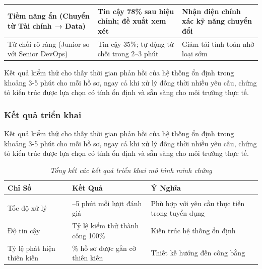 \documentclass{article}
\begin{document}
\begin{itemize}[topsep=0pt, itemsep=4pt, leftmargin=40pt]
\begin{longtable}{|
  >{\raggedright\arraybackslash}p{}|
  >{\raggedright\arraybackslash}p{}|
  >{\raggedright\arraybackslash}p{}|}
  Tiềm năng ẩn (Chuyển từ Tài chính → Data) &
  Tin cậy 78\% sau hiệu chỉnh; đề xuất xem xét &
  Nhận diện chính xác kỹ năng chuyển đổi \\
  \hline

  Từ chối rõ ràng (Junior so với Senior DevOps) &
  Tin cậy 35\%; tự động từ chối trong 2–3 phút &
  Giảm tải tính toán nhờ loại sớm \\

\end{longtable}

Kết quả kiểm thử cho thấy thời gian phản hồi của hệ thống ổn định trong khoảng 3-5 phút cho mỗi hồ sơ, ngay cả khi xử lý đồng thời nhiều yêu cầu, chứng tỏ kiến trúc được lựa chọn có tính ổn định và sẵn sàng cho môi trường thực tế.

\subsubsection{Kết quả triển khai}
Kết quả kiểm thử cho thấy thời gian phản hồi của hệ thống ổn định trong khoảng 3-5 phút cho mỗi hồ sơ, ngay cả khi xử lý đồng thời nhiều yêu cầu, chứng tỏ kiến trúc được lựa chọn có tính ổn định và sẵn sàng cho môi trường thực tế.

\begin{longtable}{|
  >{\raggedright\arraybackslash}p{}|
  >{\raggedright\arraybackslash}p{}|
  >{\raggedright\arraybackslash}p{}|}
  \hline
  \textbf{Chỉ Số} &
  \textbf{Kết Quả} &
  \textbf{Ý Nghĩa} \\
  \hline
  \endfirsthead

  \endhead

  \hline
  \endfoot

  \hline
  \caption{\centering\textit{Tổng kết các kết quả triển khai mô hình minh chứng}}
  \label{tab:ket-qua-minh-chung} \\
  \endlastfoot

  Tốc độ xử lý &
  3–5 phút mỗi lượt đánh giá &
  Phù hợp với yêu cầu thực tiễn trong tuyển dụng \\
  \hline

  Độ tin cậy &
  Tỷ lệ kiểm thử thành công 100\% &
  Kiến trúc hệ thống ổn định \\
  \hline

  Tỷ lệ phát hiện thiên kiến &
  25\% hồ sơ được gắn cờ thiên kiến &
  Thiết kế hướng đến công bằng \\
  \hline


\end{longtable}
\end{itemize}
\end{document}
